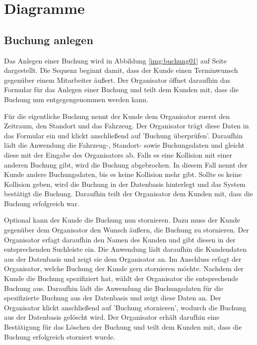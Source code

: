 \newpage

\section{Diagramme}

\subsection{Buchung anlegen}


Das Anlegen einer Buchung wird in Abbildung \ref{img:buchung01} auf Seite \pageref{img:buchung01} dargestellt. Die Sequenz beginnt damit, dass der Kunde einen Terminwunsch gegenüber einem Mitarbeiter äußert. Der Organisator öffnet daraufhin das Formular für das Anlegen einer Buchung und teilt dem Kunden mit, dass die Buchung nun entgegengenommen werden kann.

Für die eigentliche Buchung nennt der Kunde dem Organisator zuerst den Zeitraum, den Standort und das Fahrzeug. Der Organisator trägt diese Daten in das Formular ein und klickt anschließend auf 'Buchung überprüfen'. Daraufhin lädt die Anwendung die Fahrzeug-, Standort- sowie Buchungsdaten und gleicht diese mit der Eingabe des Organisators ab. Falls es eine Kollision mit einer anderen Buchung gibt, wird die Buchung abgebrochen. In diesem Fall nennt der Kunde andere Buchungsdaten, bis es keine Kollision mehr gibt. Sollte es keine Kollision geben, wird die Buchung in der Datenbasis hinterlegt und das System bestätigt die Buchung. Daraufhin teilt der Organisator dem Kunden mit, dass die Buchung erfolgreich war.

Optional kann der Kunde die Buchung nun stornieren. Dazu muss der Kunde gegenüber dem Organisator den Wunsch äußern, die Buchung zu stornieren. Der Organisator erfagt daraufhin den Namen des Kunden und gibt diesen in der entsprechenden Suchleiste ein. Die Anwendung lädt daraufhin die Kundendaten aus der Datenbasis und zeigt sie dem Organisator an. Im Anschluss erfagt der Organisator, welche Buchung der Kunde gern stornieren möchte. Nachdem der Kunde die Buchung spezifiziert hat, wählt der Organisator die entsprechende Buchung aus. Daraufhin lädt die Anwendung die Buchungsdaten für die spezifizierte Buchung aus der Datenbasis und zeigt diese Daten an. Der Organisator klickt anschließend auf 'Buchung stornieren', wodurch die Buchung aus der Datenbasis gelöscht wird. Der Organisator erhält darufhin eine Bestätigung für das Löschen der Buchung und teilt dem Kunden mit, dass die Buchung erfolgreich storniert wurde. 

